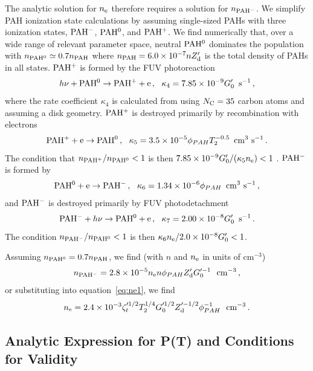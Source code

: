\documentclass[12pt,preprint,flushrt]{aastex}
\newcommand{\beq}{\begin{equation}}
\newcommand{\eeq}{\end{equation}}
\newcommand{\gs}{G_{0}^\prime}
\newcommand{\zd}{Z_{\rm d}^\prime}
\begin{document}
The analytic solution for $n_{\rm e}$ therefore requires a solution for
$n_{\rm PAH^-}$. We simplify PAH ionization state calculations by assuming
single-sized PAHs with three ionization states, ${\rm PAH^-}$, ${\rm PAH^0}$,
and ${\rm PAH^+}$. We find numerically that, over a wide range of
relevant parameter space, neutral ${\rm PAH^0}$ dominates the population with
$n_{\rm PAH^0} \simeq 0.7 n_{\rm PAH}$ where
$n_{\rm PAH} = 6.0\times 10^{-7}n\zd $ is the total density of PAHs in
all states. ${\rm PAH^+}$ is formed by the FUV photoreaction
\beq
h\nu   + {\rm PAH^0}  \rightarrow  {\rm PAH^+ + e} \,, \,\,\,\,
\kappa_4  = 7.85\times 10^{-9}\gs \,\,\,{\rm s^{-1} }\, ,
\eeq
where the rate coefficient $\kappa_4$ is calculated from \cite{bak94}
using $N_{\rm C} = 35$ carbon atoms and assuming a disk geometry.
${\rm PAH^+}$ is destroyed primarily by recombination with electrons
\beq
{\rm PAH^+ + e}  \rightarrow  {\rm PAH^0}\,, \,\,\,\,
\kappa_5  = 3.5\times 10^{-5} \phi _{PAH} T_2^{-0.5}\,\,\,{\rm cm^3\,\, s^{-1} }\, .
\eeq
The condition that $n_{\rm PAH^+}/n_{\rm PAH^0} < 1 $ is then
$7.85\times 10^{-9} \gs/(\kappa_5 n_{\rm e}) < 1$ .
${\rm PAH^-}$ is formed by
\beq
{\rm PAH^0 + e}  \rightarrow  {\rm PAH^-}\,, \,\,\,\,
\kappa_6  = 1.34\times 10^{-6}\phi _{PAH} \,\,\,{\rm cm^3\,\, s^{-1} }\, ,
\eeq
and ${\rm PAH^-}$ is destroyed primarily by FUV photodetachment
\beq
{\rm PAH^-} + h\nu  \rightarrow  {\rm PAH^0 + e}\,, \,\,\,\,
\kappa_7  = 2.00\times 10^{-8}\gs \,\,\,{\rm s^{-1} }\, .
\eeq
The condition $n_{\rm PAH^-}/n_{\rm PAH^0} < 1$ is then
$\kappa_6 n_{\rm e}/2.0\times 10^{-8} \gs < 1$.

Assuming $n_{\rm PAH^0} = 0.7n_{\rm PAH}$, we find (with $n$ and $n_{\rm e}$
in units of cm$^{-3}$)
\beq
n_{\rm PAH^-} = 2.8\times 10^{-5} n_{\rm e} n \phi _{PAH} \zd G_0^{\prime -1}
                       \,\,\,\, {\rm cm^{-3}}\, ,
\eeq
or substituting into equation~\ref{eq:ne1}, we find
\beq
n_{\rm e} = 2.4\times 10^{-3} \zeta_t^{\prime 1/2}T_2^{1/4}
   G_{0}^{\prime {1/2}} Z_{\rm d}^{\prime -1/2}\phi _{PAH}^{-1} \,\,\,\, {\rm cm^{-3}}\, .
\label{eq:ne2}
\eeq

\subsection{Analytic Expression for P(T) and Conditions for Validity}
\end{document}
